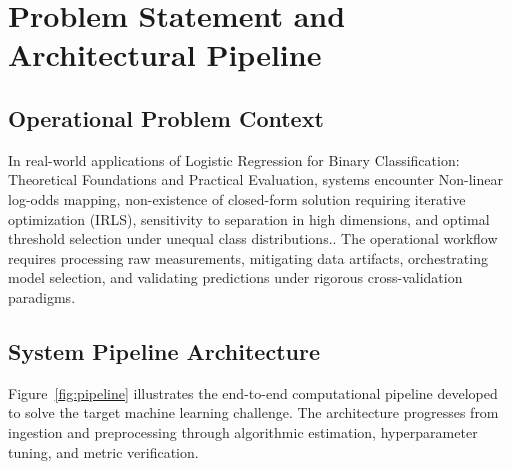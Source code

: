 \section{Problem Statement and Architectural Pipeline}

\subsection{Operational Problem Context}
In real-world applications of Logistic Regression for Binary Classification: Theoretical Foundations and Practical Evaluation, systems encounter Non-linear log-odds mapping, non-existence of closed-form solution requiring iterative optimization (IRLS), sensitivity to separation in high dimensions, and optimal threshold selection under unequal class distributions.. The operational workflow requires processing raw measurements, mitigating data artifacts, orchestrating model selection, and validating predictions under rigorous cross-validation paradigms.

\subsection{System Pipeline Architecture}
Figure~\ref{fig:pipeline} illustrates the end-to-end computational pipeline developed to solve the target machine learning challenge. The architecture progresses from ingestion and preprocessing through algorithmic estimation, hyperparameter tuning, and metric verification.


